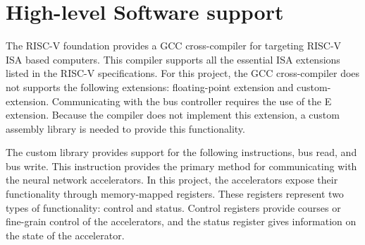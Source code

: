 \documentclass[../main.tex]{subfiles}
\begin{document}
\section{High-level Software support}
The RISC-V foundation provides a GCC cross-compiler for targeting RISC-V ISA based computers. This compiler supports all the essential ISA extensions listed in the RISC-V specifications\cite{RISC-V-isa}. For this project, the GCC cross-compiler does not supports the following extensions: floating-point extension and custom-extension. Communicating with the bus controller requires the use of the E extension. Because the compiler does not implement this extension, a custom assembly library is needed to provide this functionality.  

The custom library provides support for the following instructions, bus read, and bus write. This instruction provides the primary method for communicating with the neural network accelerators.  In this project, the accelerators expose their functionality through memory-mapped registers. These registers represent two types of functionality: control and status. Control registers provide courses or fine-grain control of the accelerators, and the status register gives information on the state of the accelerator. 
\end{document}
